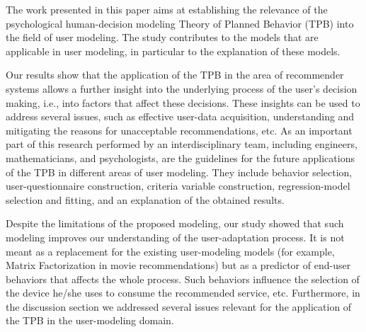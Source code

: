 \documentclass{llncs}
\begin{document}
The work presented in this paper aims at establishing the relevance of the psychological human-decision modeling Theory of Planned Behavior (TPB) into the field of user modeling. The study contributes to the models that are applicable in user modeling, in particular to the explanation of these models.

Our results show that the application of the TPB in the area of recommender systems allows a further insight into the underlying process of the user’s decision making, i.e., into factors that affect these decisions. These insights can be used to address several issues, such as effective user-data acquisition, understanding and mitigating the reasons for unacceptable recommendations, etc. As an important part of this research performed by an interdisciplinary team, including engineers, mathematicians, and psychologists, are the guidelines for the future applications of the TPB in different areas of user modeling. They include behavior selection, user-questionnaire construction, criteria variable construction, regression-model selection and fitting, and an explanation of the obtained results.

Despite the limitations of the proposed modeling, our study showed that such modeling improves our understanding of the user-adaptation process. It is not meant as a replacement for the existing user-modeling models (for example, Matrix Factorization in movie recommendations) but as a predictor of end-user behaviors that affects the whole process. Such behaviors influence the selection of the device he/she uses to consume the recommended service, etc. Furthermore, in the discussion section we addressed several issues relevant for the application of the TPB in the user-modeling domain.



% 
% 
% 







\end{document}
